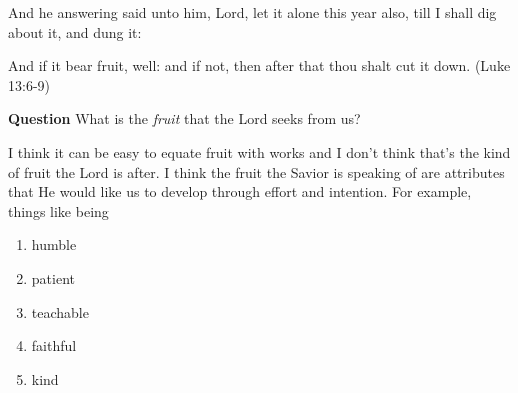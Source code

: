 And he answering said unto him, Lord, let it alone this year also, till I shall dig about it, and dung it:

And if it bear fruit, well: and if not, then after that thou shalt cut it down. (Luke 13:6-9)

\textbf{Question} What is the \emph{fruit} that the Lord seeks from us?

I think it can be easy to equate fruit with works and I don't think that's the kind of fruit the Lord is after. I think the fruit the Savior is speaking of are attributes that He would like us to develop through effort and intention. For example, things like being
\begin{enumerate}
  \item humble
  \item patient
  \item teachable
  \item faithful
  \item kind
\end{enumerate}

